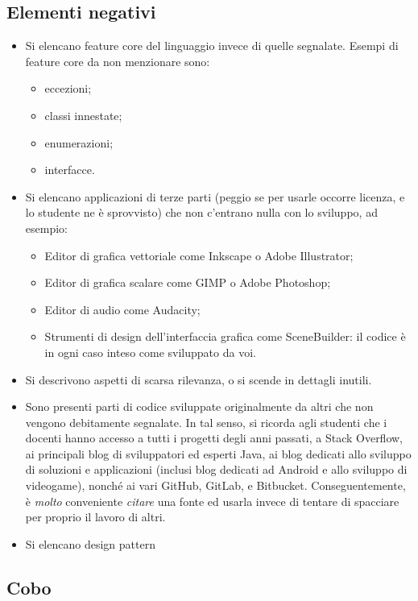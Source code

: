 \documentclass[a4paper,12pt]{report}
\begin{document}
\subsection*{Elementi negativi}
\begin{itemize}
	\item Si elencano feature core del linguaggio invece di quelle segnalate. Esempi di feature core da non menzionare sono:
    \begin{itemize}
        \item eccezioni;
        \item classi innestate;
        \item enumerazioni;
        \item interfacce.
    \end{itemize}
	\item Si elencano applicazioni di terze parti (peggio se per usarle occorre licenza, e lo studente ne è sprovvisto) che non c'entrano nulla con lo sviluppo, ad esempio:
    \begin{itemize}
        \item Editor di grafica vettoriale come Inkscape o Adobe Illustrator;
        \item Editor di grafica scalare come GIMP o Adobe Photoshop;
        \item Editor di audio come Audacity;
        \item Strumenti di design dell'interfaccia grafica come SceneBuilder: il codice è in ogni caso inteso come sviluppato da voi.
    \end{itemize}
	\item Si descrivono aspetti di scarsa rilevanza, o si scende in dettagli inutili.
	\item Sono presenti parti di codice sviluppate originalmente da altri che non vengono debitamente segnalate.
	In tal senso, si ricorda agli studenti che i docenti hanno accesso a tutti i progetti degli anni passati,
	a Stack Overflow,
	ai principali blog di sviluppatori ed esperti Java,
	ai blog dedicati allo sviluppo di soluzioni e applicazioni
	(inclusi blog dedicati ad Android e allo sviluppo di videogame),
	nonché ai vari GitHub, GitLab, e Bitbucket.
	Conseguentemente, è \emph{molto} conveniente \emph{citare} una fonte ed usarla invece di tentare di spacciare per proprio il lavoro di altri.
	\item Si elencano design pattern
\end{itemize}

\subsection{Cobo}
\end{document}
